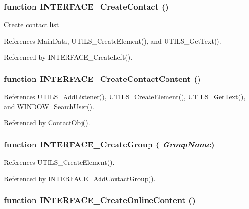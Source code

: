 \subsubsection{\setlength{\rightskip}{0pt plus 5cm}function INTERFACE\_\-CreateContact ()\hspace{0.3cm}{\tt  [private]}}\label{interface_2contact_8js_fc3a4302d4c9bf87f8f09296189d184e}


Create contact list 

References MainData, UTILS\_\-CreateElement(), and UTILS\_\-GetText().

Referenced by INTERFACE\_\-CreateLeft().
\subsubsection{\setlength{\rightskip}{0pt plus 5cm}function INTERFACE\_\-CreateContactContent ()}\label{interface_2contact_8js_0fb5ab190b974eaf63e2a6a4dbb84b52}




References UTILS\_\-AddListener(), UTILS\_\-CreateElement(), UTILS\_\-GetText(), and WINDOW\_\-SearchUser().

Referenced by ContactObj().
\subsubsection{\setlength{\rightskip}{0pt plus 5cm}function INTERFACE\_\-CreateGroup ( {\em GroupName})}\label{interface_2contact_8js_fdd2bd640d3145fa915630d0f52d1a3a}




References UTILS\_\-CreateElement().

Referenced by INTERFACE\_\-AddContactGroup().
\subsubsection{\setlength{\rightskip}{0pt plus 5cm}function INTERFACE\_\-CreateOnlineContent ()\hspace{0.3cm}{\tt  [private]}}\label{interface_2contact_8js_2e4cc3991845152ed817c111ad649e8f}


